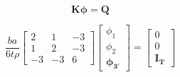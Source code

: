\documentclass[
12pt,
a4paper,
oneside,
chapter=TITLE,
sumario=tradicional
]{abntex2}
\begin{document}
\begin{equation*}
	\mathbf{K} \mathbf{\phi} = \mathbf{Q}
\end{equation*}


\begin{equation}
  \boxed{
  \frac{ba}{6t\rho}
  \begin{bmatrix}
  	2 & 1 & -3 \\
  	1 & 2 & -3 \\
  	-3 & -3 & 6
  \end{bmatrix}
  \begin{bmatrix}
  	\phi_1 \\ \phi_2 \\ \mathbf{\phi_{3'}}
  \end{bmatrix} =
  \begin{bmatrix}
  	0 \\ 0 \\ \mathbf{I_T} 
  \end{bmatrix}
  \label{eq:MEF_eq_0050}
  }
\end{equation}

%


%
%
%
%
%
%
%
%
\end{document}
